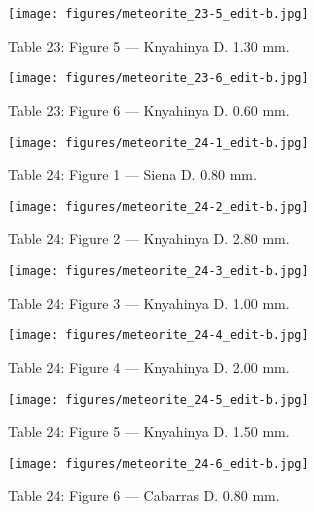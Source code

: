 \documentclass[a4paper, 12pt, oneside]{article}
\begin{document}
\clearpage
\begin{figure}[t]
\texttt{[image: figures/meteorite\_23-5\_edit-b.jpg]}
\caption{Table 23: Figure 5 --- Knyahinya D. 1.30 mm.}
\centering
\end{figure}
\clearpage
\begin{figure}[t]
\texttt{[image: figures/meteorite\_23-6\_edit-b.jpg]}
\caption{Table 23: Figure 6 --- Knyahinya D. 0.60 mm.}
\centering
\end{figure}
\clearpage
{}
\begin{figure}[t]
\texttt{[image: figures/meteorite\_24-1\_edit-b.jpg]}
\caption{Table 24: Figure 1 --- Siena D. 0.80 mm.}
\centering
\end{figure}
\clearpage
\begin{figure}[t]
\texttt{[image: figures/meteorite\_24-2\_edit-b.jpg]}
\caption{Table 24: Figure 2 --- Knyahinya D. 2.80 mm.}
\centering
\end{figure}
\clearpage
\begin{figure}[t]
\texttt{[image: figures/meteorite\_24-3\_edit-b.jpg]}
\caption{Table 24: Figure 3 --- Knyahinya D. 1.00 mm.}
\centering
\end{figure}
\clearpage
\begin{figure}[t]
\texttt{[image: figures/meteorite\_24-4\_edit-b.jpg]}
\caption{Table 24: Figure 4 --- Knyahinya D. 2.00 mm.}
\centering
\end{figure}
\clearpage
\begin{figure}[t]
\texttt{[image: figures/meteorite\_24-5\_edit-b.jpg]}
\caption{Table 24: Figure 5 --- Knyahinya D. 1.50 mm.}
\centering
\end{figure}
\clearpage
\begin{figure}[t]
\texttt{[image: figures/meteorite\_24-6\_edit-b.jpg]}
\caption{Table 24: Figure 6 --- Cabarras D. 0.80 mm.}
\centering
\end{figure}
\clearpage
{}
\end{document}
